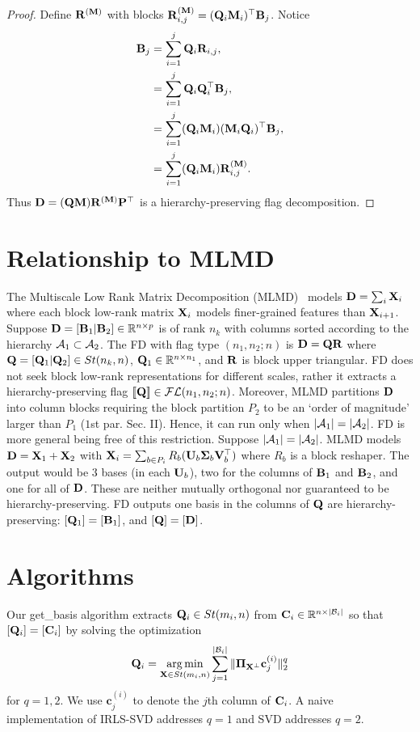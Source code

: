 \begin{proof}
    Define $\mathbf{R}^{(\mathbf{M})}$ with blocks $\mathbf{R}^{(\mathbf{M})}_{i,j} = (\mathbf{Q}_i\mathbf{M}_i)^\top\mathbf{B}_j$. Notice 
    \begin{align}
        \mathbf{B}_j &= \sum_{i=1}^j \mathbf{Q}_i \mathbf{R}_{i,j},\\
             &= \sum_{i=1}^j \mathbf{Q}_i \mathbf{Q}_i^\top  \mathbf{B}_j,\\
             &= \sum_{i=1}^j (\mathbf{Q}_i \mathbf{M}_i) (\mathbf{M}_i \mathbf{Q}_i)^\top \mathbf{B}_j,\\
             &= \sum_{i=1}^j (\mathbf{Q}_i \mathbf{M}_i)\mathbf{R}^{(\mathbf{M})}_{i,j}.
    \end{align}
    Thus $\mathbf{D} = (\mathbf{Q}\mathbf{M})\mathbf{R}^{(\mathbf{M})} \mathbf{P}^\top$ is a hierarchy-preserving flag decomposition.
\end{proof}

\section{Relationship to MLMD~\cite{ong2016beyond}}\label{sec:alg_rev}
The Multiscale Low Rank Matrix Decomposition (MLMD)~\cite{ong2016beyond} models $\mathbf{D} = \sum_i \mathbf{X}_i$ where each block low-rank matrix $\mathbf{X}_i$ models finer-grained features than $\mathbf{X}_{i+1}$. Suppose $\mathbf{D} = [\mathbf{B}_1|\mathbf{B}_2]\in \mathbb{R}^{n \times p}$ is of rank $n_k$ with columns sorted according to the hierarchy $\mathcal{A}_1 \subset \mathcal{A}_2$. The FD with flag type $(n_1,n_2;n)$ is $\mathbf{D} = \mathbf{Q} \mathbf{R}$ where $\mathbf{Q} = [\mathbf{Q}_1 | \mathbf{Q}_2] \in St(n_k,n)$, $\mathbf{Q}_1 \in \mathbb{R}^{n \times n_1}$, and $\mathbf{R}$ is block upper triangular. FD does not seek block low-rank representations for different scales, rather it extracts a hierarchy-preserving flag $[\![\mathbf{Q}]\!] \in \mathcal{FL}(n_1,n_2;n)$. Moreover, MLMD partitions $\mathbf{D}$ into column blocks requiring the block partition $P_2$ to be an `order of magnitude' larger than $P_1$ ($1$st par. Sec. II). Hence, it can run only when $|\mathcal{A}_1| = |\mathcal{A}_2|$. FD is more general being free of this restriction. Suppose $|\mathcal{A}_1| = |\mathcal{A}_2|$. MLMD models $\mathbf{D} = \mathbf{X}_1 + \mathbf{X}_2$ with $\mathbf{X}_i = \sum_{b \in P_i} R_b (\mathbf{U}_b \boldsymbol{\Sigma}_b \mathbf{V}^\top_b)$ where $R_b$ is a block reshaper. The output would be $3$ bases (in each $\mathbf{U}_b$), two for the columns of $\mathbf{B}_1$ and $\mathbf{B}_2$, and one for all of $\mathbf{D}$. These are neither mutually orthogonal nor guaranteed to be hierarchy-preserving. FD outputs one basis in the columns of $\mathbf{Q}$ are hierarchy-preserving: $[\mathbf{Q}_1]=[\mathbf{B}_1]$, and $[\mathbf{Q}] = [\mathbf{D}]$.


\section{Algorithms}\label{sec:algs}
Our get\_basis algorithm extracts $\mathbf{Q}_i \in St(m_i,n)$ from $\mathbf{C}_i \in \mathbb{R}^{n \times |\mathcal{B}_i|}$ so that $[\mathbf{Q}_i] = [\mathbf{C}_i]$ by solving the optimization
\begin{equation}
    \mathbf{Q}_i = \operatorname*{arg\min}_{\mathbf{X} \in St(m_i,n)} \sum_{j=1}^{|\mathcal{B}_i|}\| \boldsymbol{\Pi}_{\mathbf{X}^\perp} \mathbf{c}_j^{(i)}\|_2^q
\end{equation}
for $q=1,2$. We use $\mathbf{c}_j^{(i)}$ to denote the $j$th column of $\mathbf{C}_i$. A naive implementation of IRLS-SVD addresses $q=1$ and SVD addresses $q=2$.

